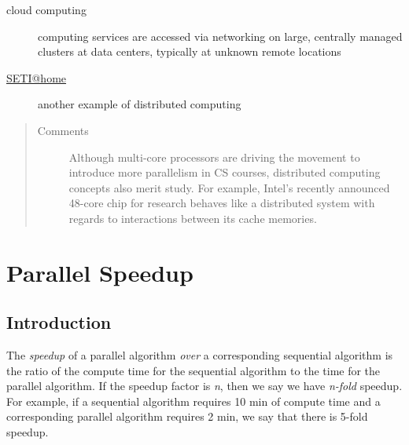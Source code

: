 \documentclass[letterpaper,10pt,english]{sphinxmanual}
\begin{document}
\begin{description}
\item[{cloud computing}] \leavevmode{}\label{Introduction/Introduction:term-cloud-computing}
computing services are accessed via networking on large, centrally managed clusters at data centers, typically at unknown remote locations

\end{description}
\begin{description}
\item[{\href{mailto:SETI@home}{SETI@home}}] \leavevmode{}\label{Introduction/Introduction:term-seti-home}
another example of distributed computing

\end{description}
\begin{quote}\begin{description}
\item[{Comments}] \leavevmode
Although multi-core processors are driving the movement to introduce more parallelism in CS courses, distributed computing concepts also merit study. For example, Intel's recently announced 48-core chip for research behaves like a distributed system with regards to interactions between its cache memories.

\end{description}\end{quote}


\chapter{Parallel Speedup}
\label{ParallelSpeedup/ParallelSpeedup:parallel-speedup}\label{ParallelSpeedup/ParallelSpeedup::doc}

\section{Introduction}
\label{ParallelSpeedup/ParallelSpeedup:introduction}
The \emph{speedup} of a parallel algorithm \emph{over} a corresponding sequential algorithm is the ratio of the compute time for the sequential algorithm to the time for the parallel algorithm.  If the speedup factor is \emph{n}, then we say we have \emph{n-fold} speedup.  For example, if a sequential algorithm requires 10 min of compute time and a corresponding parallel algorithm requires 2 min, we say that there is 5-fold speedup.
\end{document}
